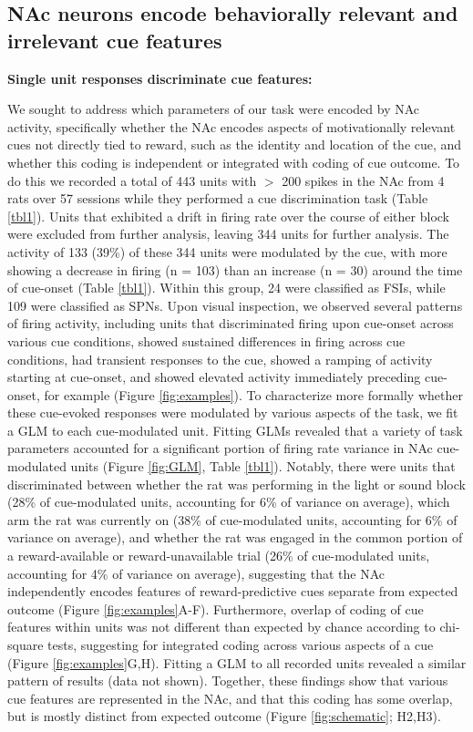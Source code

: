 \documentclass[11pt]{article}
\begin{document}
{\subsection*{NAc neurons encode behaviorally relevant and irrelevant cue features}

{\bf Single unit responses discriminate cue features:}

We sought to address which parameters of our task were encoded by NAc activity,
specifically whether the NAc encodes aspects of motivationally relevant cues not
directly tied to reward, such as the identity and location of the cue, and
whether this coding is independent or integrated with coding of cue outcome. To
do this we recorded a total of 443 units with $>$ 200 spikes in the NAc from 4
rats over 57 sessions while they performed a cue discrimination task (Table
\ref{tbl1}). Units that exhibited a drift in firing rate over the course of
either block were excluded from further analysis, leaving 344 units for further
analysis. The activity of 133 (39\%) of these 344 units were modulated by the
cue, with more showing a decrease in firing (n = 103) than an increase (n = 30)
around the time of cue-onset (Table \ref{tbl1}). Within this group, 24 were
classified as FSIs, while 109 were classified as SPNs. Upon visual inspection,
we observed several patterns of firing activity, including units that
discriminated firing upon cue-onset across various cue conditions, showed
sustained differences in firing across cue conditions, had transient responses
to the cue, showed a ramping of activity starting at cue-onset, and showed
elevated activity immediately preceding cue-onset, for example (Figure
\ref{fig:examples}). To characterize more formally whether these cue-evoked
responses were modulated by various aspects of the task, we fit a GLM to each
cue-modulated unit. Fitting GLMs revealed that a variety of task parameters
accounted for a significant portion of firing rate variance in NAc cue-modulated
units (Figure \ref{fig:GLM}, Table \ref{tbl1}). Notably, there were units that
discriminated between whether the rat was performing in the light or sound block
(28\% of cue-modulated units, accounting for 6\% of variance on average), which
arm the rat was currently on (38\% of cue-modulated units, accounting for 6\% of
variance on average), and whether the rat was engaged in the common portion of a
reward-available or reward-unavailable trial (26\% of cue-modulated units,
accounting for 4\% of variance on average), suggesting that the NAc
independently encodes features of reward-predictive cues separate from expected
outcome (Figure \ref{fig:examples}A-F). Furthermore, overlap of coding of cue
features within units was not different than expected by chance according to
chi-square tests, suggesting for integrated coding across various aspects of a
cue (Figure \ref{fig:examples}G,H). Fitting a GLM to all recorded units revealed
a similar pattern of results (data not shown). Together, these findings show
that various cue features are represented in the NAc, and that this coding has
some overlap, but is mostly distinct from expected outcome (Figure
\ref{fig:schematic}; H2,H3).

}
\end{document}

